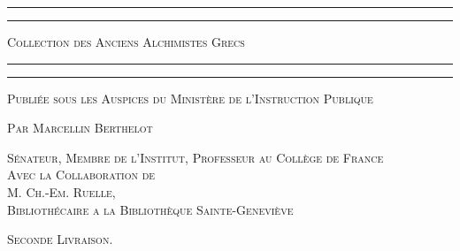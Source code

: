 \documentclass[a4paper, 11pt, oneside, polutonikogreek, french]{article}
\begin{document}
\begin{titlepage} %
	\centering %

	
	\rule{\textwidth}{1.6pt}\vspace*{-\baselineskip}\vspace*{2pt} %
	\rule{\textwidth}{0.4pt} %
	
	\vspace{1\baselineskip} %
	
	{\scshape\Huge Collection des Anciens Alchimistes Grecs}
	
	\vspace{1\baselineskip} %

	\rule{\textwidth}{0.4pt}\vspace*{-\baselineskip}\vspace{3.2pt} %
	\rule{\textwidth}{1.6pt} %
	
	\vspace{1\baselineskip} %
	
	
	{\scshape \normalsize Publiée sous les Auspices du Ministère de l'Instruction Publique}
	
	{\scshape Par \Large Marcellin Berthelot} %
	
	\vspace*{1\baselineskip} %
	
        {\scshape\scriptsize Sénateur, Membre de l'Institut, Professeur au Collège de France \\Avec la Collaboration de \\\large M. Ch.-Em. Ruelle,\\\scriptsize Bibliothécaire a la Bibliothèque Sainte-Geneviève} %
  
        \vspace{4\baselineskip}
  
	{\scshape \normalsize Seconde Livraison.} %
  


\end{titlepage}
\end{document}

